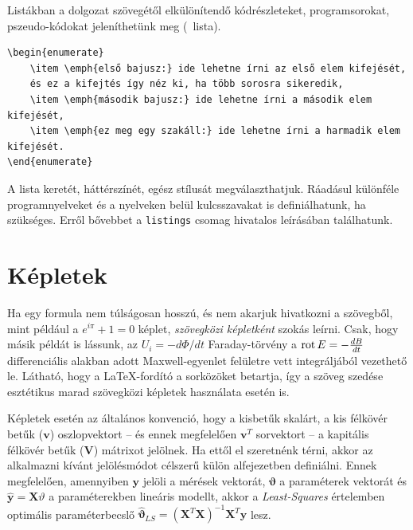 Listákban a dolgozat szövegétől elkülönítendő kódrészleteket, programsorokat, pszeudo-kódokat jeleníthetünk meg (~lista). 
\begin{lstlisting}[frame=single,float=!ht,caption=A fenti számozott felsorolás \LaTeX- forráskódja, label=listing:Example]
\begin{enumerate}
	\item \emph{első bajusz:} ide lehetne írni az első elem kifejését, 
	és ez a kifejtés így néz ki, ha több sorosra sikeredik,
	\item \emph{második bajusz:} ide lehetne írni a második elem kifejését,
	\item \emph{ez meg egy szakáll:} ide lehetne írni a harmadik elem kifejését.
\end{enumerate}
\end{lstlisting}
A lista keretét, háttérszínét, egész stílusát megválaszthatjuk. Ráadásul különféle programnyelveket és a nyelveken belül kulcsszavakat is definiálhatunk, ha szükséges. Erről bővebbet a \verb+listings+ csomag hivatalos leírásában találhatunk.

\section{Képletek}
Ha egy formula nem túlságosan hosszú, és nem akarjuk hivatkozni a szövegből, mint például a $e^{i\pi}+1=0$ képlet, \emph{szövegközi képletként} szokás leírni. Csak, hogy másik példát is lássunk, az $U_i=-d\Phi/dt$ Faraday-törvény a $\operatorname{rot} E=-\frac{dB}{dt}$ differenciális alakban adott Maxwell-egyenlet felületre vett integráljából vezethető le. Látható, hogy a \LaTeX-fordító a sorközöket betartja, így a szöveg szedése esztétikus marad szövegközi képletek használata esetén is.

Képletek esetén az általános konvenció, hogy a kisbetűk skalárt, a kis félkövér betűk ($\mathbf{v}$) oszlopvektort -- és ennek megfelelően $\mathbf{v}^T$ sorvektort -- a kapitális félkövér betűk ($\mathbf{V}$) mátrixot jelölnek. Ha ettől el szeretnénk térni, akkor az alkalmazni kívánt jelölésmódot célszerű külön alfejezetben definiálni. Ennek megfelelően, amennyiben $\mathbf{y}$ jelöli a mérések vektorát, $\mathbf{\vartheta}$ a paraméterek vektorát és $\hat{\mathbf{y}}=\mathbf{X}\vartheta$ a paraméterekben lineáris modellt, akkor a \emph{Least-Squares} értelemben optimális paraméterbecslő $\hat{\mathbf{\vartheta}}_{LS}=(\mathbf{X}^T\mathbf{X})^{-1}\mathbf{X}^T\mathbf{y}$ lesz.

